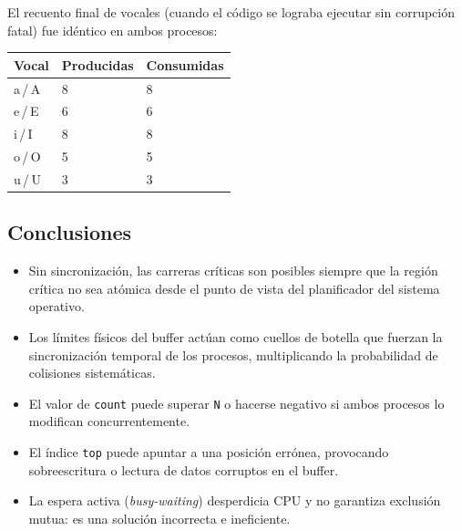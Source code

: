 \documentclass[a4paper, 12pt]{article}
\newcommand{\ic}[1]{\texttt{#1}}
\begin{document}
El recuento final de vocales (cuando el código se lograba ejecutar sin corrupción fatal) fue idéntico en ambos procesos:

\vspace{0.5em}
\begin{center}
\begin{tabular}{C{3cm} C{3cm} C{3cm}}
  \toprule
  \color{white}\textbf{Vocal} &
  \color{white}\textbf{Producidas} &
  \color{white}\textbf{Consumidas} \\
  \midrule
  a\,/\,A & 8 & 8 \\
  e\,/\,E & 6 & 6 \\
  i\,/\,I & 8 & 8 \\
  o\,/\,O & 5 & 5 \\
  u\,/\,U & 3 & 3 \\
  \bottomrule
\end{tabular}
\end{center}

\subsection{Conclusiones}

\begin{itemize}
  \item Sin sincronización, las carreras críticas son posibles siempre
        que la región crítica no sea atómica desde el punto de vista del
        planificador del sistema operativo.
  \item Los límites físicos del buffer actúan como cuellos de botella que fuerzan la sincronización temporal de los procesos, multiplicando la probabilidad de colisiones sistemáticas.
  \item El valor de \ic{count} puede superar \ic{N} o hacerse negativo
        si ambos procesos lo modifican concurrentemente.
  \item El índice \ic{top} puede apuntar a una posición errónea,
        provocando sobreescritura o lectura de datos corruptos en el
        buffer.
  \item La espera activa (\emph{busy-waiting}) desperdicia CPU y no
        garantiza exclusión mutua: es una solución incorrecta e
        ineficiente.
\end{itemize}
\end{document}

